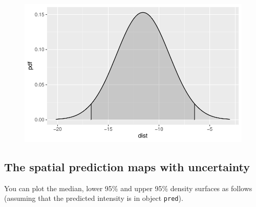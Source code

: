 \documentclass[
  a4paper,
]{article}
\newenvironment{Shaded}{\begin{snugshade}}{\end{snugshade}}
\newcommand{\DecValTok}[1]{\textcolor[rgb]{0.68,0.00,0.00}{#1}}
\newcommand{\FloatTok}[1]{\textcolor[rgb]{0.68,0.00,0.00}{#1}}
\newcommand{\FunctionTok}[1]{\textcolor[rgb]{0.28,0.35,0.67}{#1}}
\newcommand{\NormalTok}[1]{\textcolor[rgb]{0.00,0.23,0.31}{#1}}
\newcommand{\OtherTok}[1]{\textcolor[rgb]{0.00,0.23,0.31}{#1}}
\newcommand{\SpecialCharTok}[1]{\textcolor[rgb]{0.37,0.37,0.37}{#1}}
\newcommand{\StringTok}[1]{\textcolor[rgb]{0.13,0.47,0.30}{#1}}
\begin{document}
\begin{figure}[H]

{\centering \includegraphics{pedometron_files/figure-pdf/unnamed-chunk-11-2.pdf}

}

\end{figure}

\hypertarget{the-spatial-prediction-maps-with-uncertainty}{%
\subsection{The spatial prediction maps with
uncertainty}\label{the-spatial-prediction-maps-with-uncertainty}}

You can plot the median, lower 95\% and upper 95\% density surfaces as
follows (assuming that the predicted intensity is in object
\texttt{pred}).

\begin{Shaded}
\end{Shaded}
\end{document}
